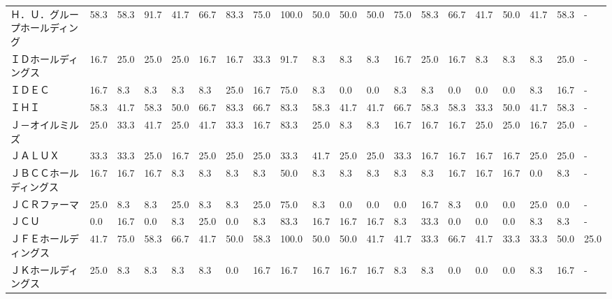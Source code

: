 \documentclass[a4paper，11pt]{jsarticle}
\begin{document}
\begin{longtable}[c]{lp{3mm}p{3mm}p{3mm}p{3mm}p{3mm}p{3mm}p{3mm}p{3mm}p{3mm}p{3mm}p{3mm}p{3mm}p{3mm}p{3mm}p{3mm}p{3mm}p{3mm}p{3mm}p{3mm}}
Ｈ．Ｕ．グループホールディング &   58.3 &   58.3 &      91.7 &      41.7 &       66.7 &   83.3 &   75.0 &  100.0 &    50.0 &    50.0 &   50.0 &  75.0 &   58.3 &    66.7 &    41.7 &  50.0 &  41.7 &  58.3 &     - \\
ＩＤホールディングス      &   16.7 &   25.0 &      25.0 &      25.0 &       16.7 &   16.7 &   33.3 &   91.7 &     8.3 &     8.3 &    8.3 &  16.7 &   25.0 &    16.7 &     8.3 &   8.3 &   8.3 &  25.0 &     - \\
ＩＤＥＣ            &   16.7 &    8.3 &       8.3 &       8.3 &        8.3 &   25.0 &   16.7 &   75.0 &     8.3 &     0.0 &    0.0 &   8.3 &    8.3 &     0.0 &     0.0 &   0.0 &   8.3 &  16.7 &     - \\
ＩＨＩ             &   58.3 &   41.7 &      58.3 &      50.0 &       66.7 &   83.3 &   66.7 &   83.3 &    58.3 &    41.7 &   41.7 &  66.7 &   58.3 &    58.3 &    33.3 &  50.0 &  41.7 &  58.3 &     - \\
Ｊ－オイルミルズ        &   25.0 &   33.3 &      41.7 &      25.0 &       41.7 &   33.3 &   16.7 &   83.3 &    25.0 &     8.3 &    8.3 &  16.7 &   16.7 &    16.7 &    25.0 &  25.0 &  16.7 &  25.0 &     - \\
ＪＡＬＵＸ           &   33.3 &   33.3 &      25.0 &      16.7 &       25.0 &   25.0 &   25.0 &   33.3 &    41.7 &    25.0 &   25.0 &  33.3 &   16.7 &    16.7 &    16.7 &  16.7 &  25.0 &  25.0 &     - \\
ＪＢＣＣホールディングス    &   16.7 &   16.7 &      16.7 &       8.3 &        8.3 &    8.3 &    8.3 &   50.0 &     8.3 &     8.3 &    8.3 &   8.3 &    8.3 &    16.7 &    16.7 &  16.7 &   0.0 &   8.3 &     - \\
ＪＣＲファーマ         &   25.0 &    8.3 &       8.3 &      25.0 &        8.3 &    8.3 &   25.0 &   75.0 &     8.3 &     0.0 &    0.0 &   0.0 &   16.7 &     8.3 &     0.0 &   0.0 &  25.0 &   0.0 &     - \\
ＪＣＵ             &    0.0 &   16.7 &       0.0 &       8.3 &       25.0 &    0.0 &    8.3 &   83.3 &    16.7 &    16.7 &   16.7 &   8.3 &   33.3 &     0.0 &     0.0 &   0.0 &   8.3 &   8.3 &     - \\
ＪＦＥホールディングス     &   41.7 &   75.0 &      58.3 &      66.7 &       41.7 &   50.0 &   58.3 &  100.0 &    50.0 &    50.0 &   41.7 &  41.7 &   33.3 &    66.7 &    41.7 &  33.3 &  33.3 &  50.0 &  25.0 \\
ＪＫホールディングス      &   25.0 &    8.3 &       8.3 &       8.3 &        8.3 &    0.0 &   16.7 &   16.7 &    16.7 &    16.7 &   16.7 &   8.3 &    8.3 &     0.0 &     0.0 &   0.0 &   8.3 &  16.7 &     - \\

\end{longtable}
\end{document}
